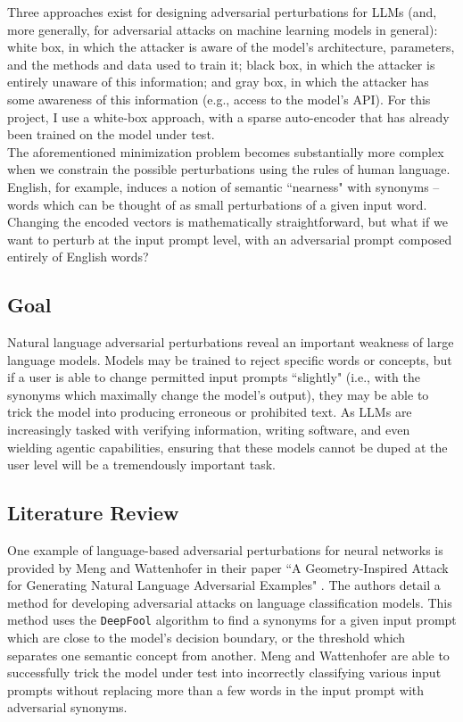 \documentclass{article}
\begin{document}
Three approaches exist for designing adversarial perturbations for LLMs (and, more generally, for adversarial attacks on machine learning models in general): white box, in which the attacker is aware of the model's architecture, parameters, and the methods and data used to train it; black box, in which the attacker is entirely unaware of this information; and gray box, in which the attacker has some awareness of this information (e.g., access to the model's API). For this project, I use a white-box approach, with a sparse auto-encoder that has already been trained on the model under test.\\

The aforementioned minimization problem becomes substantially more complex when we constrain the possible perturbations using the rules of human language. English, for example, induces a notion of semantic ``nearness" with synonyms -- words which can be thought of as small perturbations of a given input word. Changing the encoded vectors is mathematically straightforward, but what if we want to perturb at the input prompt level, with an adversarial prompt composed entirely of English words? \\

\subsection*{Goal}

Natural language adversarial perturbations reveal an important weakness of large language models. Models may be trained to reject specific words or concepts, but if a user is able to change permitted input prompts ``slightly" (i.e., with the synonyms which maximally change the model's output), they may be able to trick the model into producing erroneous or prohibited text. As LLMs are increasingly tasked with verifying information, writing software, and even wielding agentic capabilities, ensuring that these models cannot be duped at the user level will be a tremendously important task.

\subsection*{Literature Review}

One example of language-based adversarial perturbations for neural networks is provided by Meng and Wattenhofer in their paper ``A Geometry-Inspired Attack for Generating Natural Language Adversarial Examples" \citep{meng2020}. The authors detail a method for developing adversarial attacks on language classification models. This method uses the \texttt{DeepFool} algorithm to find a synonyms for a given input prompt which are close to the model's decision boundary, or the threshold which separates one semantic concept from another. Meng and Wattenhofer are able to successfully trick the model under test into incorrectly classifying various input prompts without replacing more than a few words in the input prompt with adversarial synonyms. \\
\end{document}
